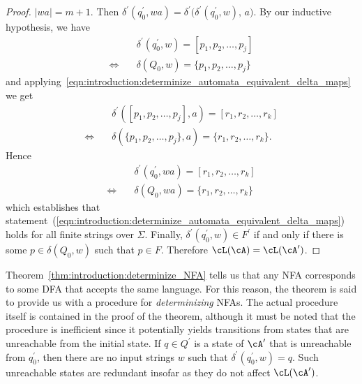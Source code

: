 \begin{proof}
$|wa| = m + 1$. Then
$
\delta^\prime (q_0^\prime, wa)
=
\delta^\prime \big( \delta^\prime (q_0^\prime, w),\, a \big)
$. By our inductive hypothesis, we have
\begin{align*}
&\quad \delta^\prime (q_0^\prime, w)
=
[p_1, p_2, \dots, p_j] \\
\Longleftrightarrow
&\quad \delta(Q_0, w)
=
\{p_1, p_2, \dots, p_j\}
\end{align*}
and
applying~\eqref{eqn:introduction:determinize_automata_equivalent_delta_maps}
we get
\begin{align*}
&\quad \delta^\prime \left( [p_1, p_2, \dots, p_j], a \right)
=
[r_1, r_2, \dots, r_k] \\
\Longleftrightarrow
&\quad \delta \left( \{p_1, p_2, \dots, p_j\}, a \right)
=
\{r_1, r_2, \dots, r_k\}.
\end{align*}
Hence
\begin{align*}
&\quad \delta^\prime (q_0^\prime, wa)
=
[r_1, r_2, \dots, r_k] \\
\Longleftrightarrow
&\quad \delta (Q_0, wa)
=
\{r_1, r_2, \dots, r_k\}
\end{align*}
which establishes that
statement~(\ref{eqn:introduction:determinize_automata_equivalent_delta_maps})
holds for all finite strings over $\Sigma$. Finally,
$\delta^\prime (q_0^\prime, w) \in F^\prime$ if and only if there is
some $p \in \delta(Q_0, w)$ such that $p \in F$. Therefore
$\cL(\cA) = \cL (\cA^\prime)$.
\end{proof}

Theorem~\ref{thm:introduction:determinize_NFA} tells us that any NFA
corresponds to some DFA that accepts the same language. For this
reason, the theorem is said to provide us with a procedure for
\emph{determinizing} NFAs. The actual procedure itself is contained in
the proof of the theorem, although it must be noted that the procedure
is inefficient since it potentially yields transitions from states that are
unreachable from the initial state. If $q \in Q^\prime$ is a state of
$\cA^\prime$ that is unreachable from $q_0^\prime$, then there are no
input strings $w$ such that $\delta^\prime (q_0^\prime, w) = q$. Such
unreachable states are redundant insofar as they do not affect
$\cL(\cA^\prime)$.

